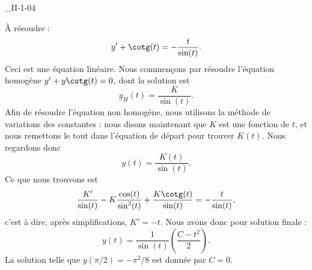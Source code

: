 

\begin{corrige}{_II-1-04}

À résoudre : 
\begin{equation}
	y'+\cotg(t)=-\frac{ t }{ \sin(t) }.
\end{equation}
Ceci est une équation linéaire. Nous commençons par résoudre l'équation homogène $y'+y\cotg(t)=0$, dont la solution est
\begin{equation}
	y_H(t)=\frac{ K }{ \sin(t) }.
\end{equation}
Afin de résoudre l'équation non homogène, nous utilisons la méthode de variations des constantes : nous disons maintenant que $K$ est une fonction de $t$, et nous remettons le tout dans l'équation de départ pour trouver $K(t)$. Nous regardons donc
\begin{equation}
	y(t)=\frac{ K(t) }{ \sin(t) }.
\end{equation}
Ce que nous trouvons est
\begin{equation}
	\frac{ K' }{ \sin(t) }-K\frac{ \cos(t) }{ \sin^2(t) }+\frac{ K\cotg(t) }{ \sin(t) }=-\frac{ t }{ \sin(t) },
\end{equation}
c'est à dire, après simplifications,  $K'=-t$. Nous avons donc pour solution finale :
\begin{equation}
	y(t)=\frac{ 1 }{ \sin(t) }\left( \frac{ C-t^2 }{ 2 } \right).
\end{equation}
La solution telle que $y(\pi/2)=-\pi^2/8$ est donnée par $C=0$.

\end{corrige}
